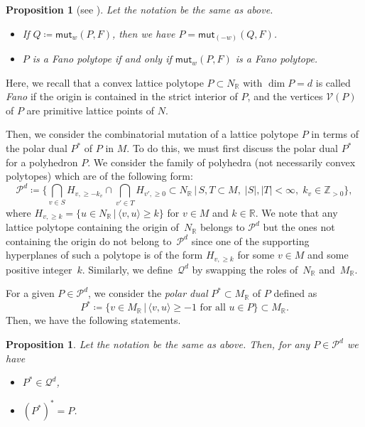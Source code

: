 \documentclass[11pt]{article}
\numberwithin{equation}{section}
\numberwithin{equation}{section}
\numberwithin{figure}{section}
\numberwithin{table}{section}
\newtheorem{Proposition}[Theorem]{Proposition}
 { \theoremstyle{definition}
\newtheorem{Definition}[Theorem]{Definition}
\newtheorem{Note}[Theorem]{Note}
\newtheorem{Example}[Theorem]{Example}
\newtheorem{Remark}[Theorem]{Remark}
\newtheorem{observation}[Theorem]{Observation}
\newtheorem{operation}[Theorem]{Operation}
\newtheorem{setting}[Theorem]{Setting}}
\newcommand{\ZZ}{\mathbb{Z}}
\newcommand{\RR}{\mathbb{R}}
\newcommand{\calP}{\mathcal{P}}
\newcommand{\calQ}{\mathcal{Q}}
\newcommand{\calV}{\mathcal{V}}
\newcommand{\mutation}{\mathsf{mut}}
\begin{document}
\setcounter{Theorem}{4}
\begin{Proposition}[{see \cite[Lemma~2 and Proposition~2]{ACGK}}]\label{properties_mutation_polygon}
Let the notation be the same as above.
\begin{itemize}\itemsep=0pt
\item[\rm (1)] If $Q\coloneqq\mutation_w(P,F)$, then we have $P=\mutation_{(-w)}(Q,F)$.
\item[\rm (2)] $P$ is a Fano polytope if and only if $\mutation_w(P,F)$ is a Fano polytope.
\end{itemize}
\end{Proposition}

Here, we recall that a convex lattice polytope $P\subset N_\RR$ with $\dim P=d$ is called \emph{Fano} if the origin is contained in the strict interior of $P$,
and the vertices $\calV(P)$ of $P$ are primitive lattice points of $N$.

Then, we consider the combinatorial mutation of a lattice polytope $P$ in terms of the polar dual $P^*$ of $P$ in $M$.
To do this, we must first discuss the polar dual $P^*$ for a polyhedron $P$.
We consider the family of polyhedra (not necessarily convex polytopes) which are of the following form:
\begin{displaymath}
\calP^d \coloneqq \bigg\{ \bigcap_{v \in S} H_{v,\geq -k_v} \cap \bigcap_{v' \in T}H_{v',\geq 0} \subset N_\RR \,|\, S,T \subset M, \; |S|, |T| < \infty, \; k_v \in \ZZ_{>0} \bigg\},
\end{displaymath}
where $H_{v,\geq k}=\{u \in N_\RR \,|\, \langle v,u \rangle \geq k\}$ for $v \in M$ and $k \in \RR$.
We note that any lattice polytope containing the origin of~$N_\RR$ belongs to $\calP^d$ but the ones not containing the origin do not belong to~$\calP^d$
since one of the supporting hyperplanes of such a polytope is of the form $H_{v, \geq k}$ for some $v \in M$ and some positive integer~$k$.
Similarly, we define~$\calQ^d$ by swapping the roles of~$N_\RR$ and~$M_\RR$.

For a given $P \in \calP^d$, we consider the \emph{polar dual} $P^* \subset M_\RR$ of $P$ defined as
\begin{displaymath}
P^* \coloneqq \{v \in M_\RR\,|\,\langle v,u\rangle\ge-1 \text{ for all } u\in P\}\subset M_\RR.
\end{displaymath}
Then, we have the following statements.

\begin{Proposition}\label{prop_dual_polytope}
Let the notation be the same as above. Then, for any $P \in \calP^d$ we have
\begin{itemize}\itemsep=0pt
\item[$(i)$] $P^* \in \calQ^d$,
\item[$(ii)$] $(P^*)^*=P$.
\end{itemize}
\end{Proposition}
\end{document}
